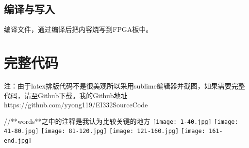 \documentclass{article}
\begin{document}
        \subsection{编译与写入} 编译文件，通过编译后把内容烧写到FPGA板中。
    
    \section{完整代码}
    
    \par 注：由于latex排版代码不是很美观所以采用sublime编辑器并截图，如果需要完整代码，请至Github下载。我的Github地址https://github.com/yyong119/EI332SourceCode
    \par //**words**之中的注释是我认为比较关键的地方
	\newline
    \texttt{[image: 1-40.jpg]}
    \newline
    \texttt{[image: 41-80.jpg]}
    \newline
    \texttt{[image: 81-120.jpg]}
    \newline
    \texttt{[image: 121-160.jpg]}
    \newline
    \texttt{[image: 161-end.jpg]}
\end{document}
